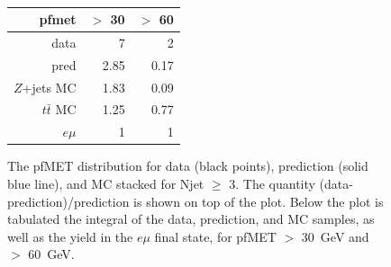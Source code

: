 \begin{figure}[hbtp]
  \begin{center}
	\\ \medskip 
    \begin{tabular}{r|r|r}
      pfmet          & $>$ 30 & $>$ 60 \\ \hline
      data           &     7  &     2  \\
      pred           &  2.85  &  0.17  \\
      $Z$+jets MC    &  1.83  &  0.09  \\
      $t\bar{t}$ MC  &  1.25  &  0.77  \\
      $e\mu$         &     1  &     1  \\
   \end{tabular}
    \caption{The pfMET distribution for data (black points), prediction (solid blue line), and MC stacked for Njet $\ge$ 3. 
      The quantity (data-prediction)/prediction is shown on top of the plot.
      Below the plot is tabulated the integral of the data, prediction, and MC samples, as well as the yield in the $e\mu$
      final state, for pfMET $>$ 30~GeV and $>$ 60~GeV.
    }
    \label{fig:pfpredge3}
  \end{center}
\end{figure}

